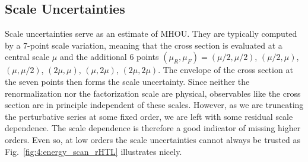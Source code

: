 \subsection{Scale Uncertainties}\label{subsec:4:scale_uncertainties}
Scale uncertainties serve as an estimate of \acs{MHOU}. They are typically computed by a 7-point scale variation, meaning that the cross section is evaluated at a central scale $\mu$ and the additional 6 points $(\mu_R, \mu_F) = (\mu/2, \mu/2)$, $(\mu/2, \mu)$, $(\mu, \mu/2)$, $(2 \mu, \mu)$, $(\mu, 2 \mu)$, $(2 \mu, 2 \mu)$. The envelope of the cross section at the seven points then forms the scale uncertainty. Since neither the renormalization nor the factorization scale are physical, observables like the cross section are in principle independent of these scales. However, as we are truncating the perturbative series at some fixed order, we are left with some residual scale dependence. The scale dependence is therefore a good indicator of missing higher orders. Even so, at low orders the scale uncertainties cannot always be trusted as Fig.~\ref{fig:4:energy_scan_rHTL} illustrates nicely.

